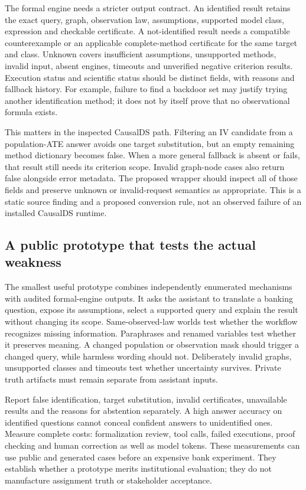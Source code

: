 The formal engine needs a stricter output contract. An identified result retains
the exact query, graph, observation law, assumptions, supported model class,
expression and checkable certificate. A not-identified result needs a compatible
counterexample or an applicable complete-method certificate for the same target
and class. Unknown covers insufficient assumptions, unsupported methods, invalid
input, absent engines, timeouts and unverified negative criterion results.
Execution status and scientific status should be distinct fields, with reasons
and fallback history. For example, failure to find a backdoor set may justify
trying another identification method; it does not by itself prove that no
observational formula exists. \citep{exec14_ident_contract}

This matters in the inspected CausalDS path. Filtering an IV candidate from a
population-ATE answer avoids one target substitution, but an empty remaining
method dictionary becomes false. When a more general fallback is absent or
fails, that result still needs its criterion scope. Invalid graph-node cases
also return false alongside error metadata. The proposed wrapper should inspect
all of those fields and preserve unknown or invalid-request semantics as
appropriate. This is a static source finding and a proposed conversion rule,
not an observed failure of an installed CausalDS runtime.
\citep{exec14_ident_packages,exec14_ident_contract}

\subsection{A public prototype that tests the actual weakness}

The smallest useful prototype combines independently enumerated mechanisms with
audited formal-engine outputs. It asks the assistant to translate a banking
question, expose its assumptions, select a supported query and explain the
result without changing its scope. Same-observed-law worlds test whether the
workflow recognizes missing information. Paraphrases and renamed variables test
whether it preserves meaning. A changed population or observation mask should
trigger a changed query, while harmless wording should not. Deliberately invalid
graphs, unsupported classes and timeouts test whether uncertainty survives.
Private truth artifacts must remain separate from assistant inputs.
\citep{exec14_ident_contract}

Report false identification, target substitution, invalid certificates,
unavailable results and the reasons for abstention separately. A high answer
accuracy on identified questions cannot conceal confident answers to
unidentified ones. Measure complete costs: formalization review, tool calls,
failed executions, proof checking and human correction as well as model tokens.
These measurements can use public and generated cases before an expensive bank
experiment. They establish whether a prototype merits institutional evaluation;
they do not manufacture assignment truth or stakeholder acceptance.
\citep{exec14_ident_contract}

